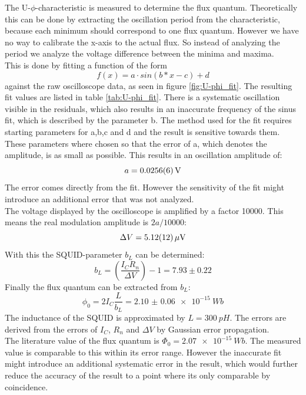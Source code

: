 \documentclass[12pt,a4paper]{article}
\begin{document}
The U-$\si{\phi}$-characteristic is measured to determine the flux quantum. Theoretically this can be done by extracting the oscillation period from the characteristic, because each minimum should correspond to one flux quantum. However we have no way to calibrate the x-axis to the actual flux. So instead of analyzing the period we analyze the voltage difference between the minima and maxima.\\
This is done by fitting a function of the form
\begin{equation}
f(x) = a \cdot sin(b*x-c) + d
\label{eq:fit}
\end{equation}
against the raw oscilloscope data, as seen in figure \ref{fig:U-phi_fit}. The resulting fit values are listed in table \ref{tab:U-phi_fit}. There is a systematic oscillation visible in the residuals, which also results in an inaccurate frequency of the sinus fit, which is described by the parameter b. The method used for the fit requires starting parameters for a,b,c and d and the result is sensitive towards them. These parameters where chosen so that the error of a, which denotes the amplitude, is as small as possible. This results in an oscillation amplitude of:
\begin{equation}
a = \SI{0.0256\pm0.0006}{V}
\end{equation}
The error comes directly from the fit. However the sensitivity of the fit might introduce an additional error that was not analyzed.\\
The voltage displayed by the oscilloscope is amplified by a factor 10000. This means the real modulation amplitude is $2a/10000$:
\begin{equation}
\Delta V = \SI{5.12\pm 0.12}{\mu V}
\end{equation}
With this the SQUID-parameter $b_L$ can be determined:
\begin{equation}
b_L = \left(\dfrac{I_C R_n}{\Delta V}\right) -1 = 7.93\pm 0.22
\end{equation}
Finally the flux quantum can be extracted from $b_L$:
\begin{equation}
\phi_0 = 2 I_C \dfrac{L}{b_L} = \SI{2.10(6)e-15}{Wb}
\end{equation}
The inductance of the SQUID is approximated by $L = \SI{300}{pH}$.
The errors are derived from the errors of $I_C$, $R_n$ and $\Delta V$ by Gaussian error propagation.\\
The literature value of the flux quantum is $\Phi _0 = \SI{2.07e-15}{Wb}$. The measured value is comparable to this within its error range. However the inaccurate fit might introduce an additional systematic error in the result, which would further reduce the accuracy of the result to a point where its only comparable by coincidence.
\end{document}
